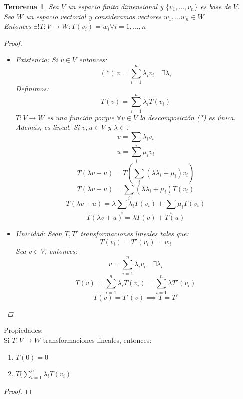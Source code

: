 \documentclass[11pt]{book}
\newtheorem{thm}{Terorema}[section]
\theoremstyle{definition}
\begin{document}
\begin{thm}
Sea $V$ un espacio finito dimensional y $\{v_1,...,v_n\}$ es base de $V$.\\
Sea $W$ un espacio vectorial y consideramos vectores $w_1,...w_n\in W$\\
Entonces $\exists !T:V\rightarrow W: T(v_i)=w_i\forall i=1,...,n$
\begin{proof}
\begin{itemize}
	\item Existencia: Si $v\in V$ entonces:
	\[(*)\, v=\sum^n_{i=1}\lambda_i v_i\quad \exists \lambda_i\]
	Definimos:
	\[T(v)=\sum^n_{i=1}\lambda_i T(v_i)\]
	$T:V\rightarrow W$ es una función porque $\forall v\in V$ la descomposición (*) es única.\\
	Además, es lineal. Si $v,u\in V$ y $\lambda\in\mathbb{F}$
	\[v=\sum_i \lambda_i v_i\]
	\[u=\sum_i\mu_i v_i\]
	\[T(\lambda v+u)=T(\sum_i(\lambda\lambda_i+\mu_i)v_i)\]
	\[T(\lambda v+u)=\sum_i(\lambda\lambda_i+\mu_i)T(v_i)\]
	\[T(\lambda v+u)=\lambda\sum_i\lambda_i T(v_i)+\sum_i\mu_i T(v_i)\]
	\[T(\lambda v+u)=\lambda T(v)+T(u)\]
	\item Unicidad: Sean $T,T'$ transformaciones lineales tales que:
	\[T(v_i)=T'(v_i)=w_i\]
	Sea $v\in V$, entonces:
	\[v=\sum^n_{i=1}\lambda_i v_i\quad \exists \lambda_i\]
	\[T(v)=\sum^n_{i=1}\lambda_i T(v_i)=\sum^n_{i=1}\lambda T'(v_i)\]
	\[T(v)=T'(v)\implies T=T'\]
\end{itemize}
\end{proof}
\end{thm}
Propiedades:\\
Si $T:V\rightarrow W$ transformaciones lineales, entonces:
\begin{enumerate}
	\item $T(0)=0$
	
	\item $T(\sum^n_{i=1}\lambda_iT(v_i)$
\end{enumerate}
\begin{proof}

\end{proof}
\end{document}

